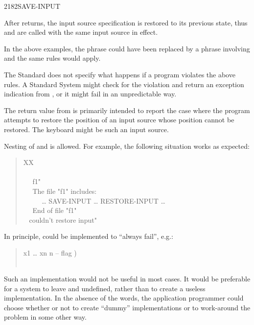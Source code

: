 \begin{worddef}{2182}{SAVE-INPUT}
\begin{defer}
		After  returns, the input source specification
		is restored to its previous state, thus  and
		 are called with the same input source in
		effect.

		In the above examples, the  phrase could have
		been replaced by a phrase involving 
		and the same rules would apply.

		The Standard does not specify what happens if a program
		violates the above rules. A Standard System might check for
		the violation and return an exception indication from
		, or it might fail in an unpredictable
		way.

		The return value from  is primarily
		intended to report the case where the program attempts to
		restore the position of an input source whose position cannot
		be restored. The keyboard might be such an input source.

		Nesting of  and  is
		allowed. For example, the following situation works as
		expected:

		\begin{quote}\ttfamily
			\word{:} XX \\
			\tab {} \\
			\tab~~  f1"  \\
			\tab~~  The file "f1" includes: \\
			\tab~~  ~~ {\ldots} SAVE-INPUT {\ldots} RESTORE-INPUT {\ldots} \\
			\tab~~  End of file "f1" \\
			\tab {} ~  couldn't restore input" \\
			\word{;}
		\end{quote}

		In principle,  could be implemented to
		``always fail'', e.g.:

		\begin{quote}\ttfamily
			\word{:}   x1 {\ldots} xn n -- flag ) \\
			     \\
			\word{;}
		\end{quote}

		Such an implementation would not be useful in most cases. It
		would be preferable for a system to leave 
		and  undefined, rather than to create a
		useless implementation. In the absence of the words, the
		application programmer could choose whether or not to create
		``dummy'' implementations or to work-around the problem in
		some other way.


\end{defer}
\end{worddef}
